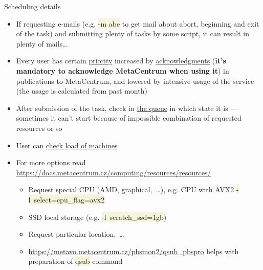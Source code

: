 \documentclass[compress, xelatex, 11pt, xcolor=svgnames, aspectratio=169,
	hyperref={
		bookmarks=true,
		unicode=true,
		colorlinks=true,
		pdftitle={Linux, command line and MetaCentrum},
		plainpages=false,
		pdfauthor={Vojtech Zeisek},
		pdfsubject={Course about use of Linux command line, writing shell scripts and using MetaCentrum of CESNET},
		pdfcreator={XeLaTeX},
		pdfkeywords={Linux, GNU, BASH, shell, command line, MetaCentrum},
		linkcolor=DarkRed, %
		anchorcolor=DarkBlue, %
		citecolor=Indigo, %
		filecolor=NavyBlue, %
		menucolor=DarkMagenta, %
		urlcolor=DarkBlue, %
		},
	url={hyphens, lowtilde} %
	]{beamer}
\renewcommand{\texttt}[1]{\colorbox{Beige}{{\ttfamily #1}}}
\begin{document}
\begin{frame}[allowframebreaks]{Scheduling details}
\begin{itemize}
\begin{itemize}
		\end{itemize}
		\item If requesting e-mails (e.g. \texttt{-m abe} to get mail about abort, beginning and exit of the task) and submitting plenty of tasks by some script, it can result in plenty of mails\ldots
		\item Every user has certain \href{https://metavo.metacentrum.cz/pbsmon2/users/}{priority} increased by \href{https://docs.metacentrum.cz/access/terms/\#acknowledgements-and-publications}{acknowledgments} (\textbf{it's mandatory to acknowledge MetaCentrum when using it}) in publications to MetaCentrum, and lowered by intensive usage of the service (the usage is calculated from past month)
		\item After submission of the task, check in \href{https://metavo.metacentrum.cz/pbsmon2/queues/jobsQueued}{the queue} in which state it is --- sometimes it can't start because of impossible combination of requested resources or so
		\item User can \href{https://metavo.metacentrum.cz/pbsmon2/nodes/physical}{check load of machines}
		\item For more options read \url{https://docs.metacentrum.cz/computing/resources/resources/}
		\begin{itemize}
			\item Request special CPU (AMD, graphical,~\ldots), e.g. CPU with AVX2 \texttt{-l~select=cpu\_flag=avx2}
			\item SSD local storage (e.g. \texttt{-l~scratch\_ssd=1gb})
			\item Request particular location,~\ldots
			\item \url{https://metavo.metacentrum.cz/pbsmon2/qsub_pbspro} helps with preparation of \texttt{qsub} command
		\end{itemize}
	\end{itemize}
\end{frame}
\end{document}
